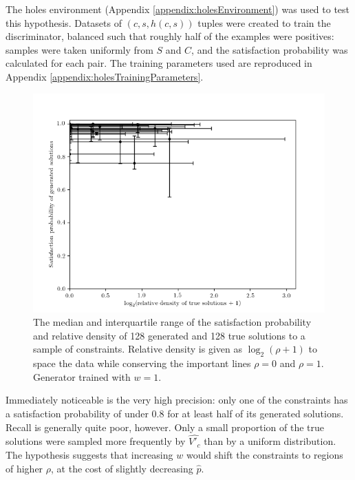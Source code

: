 \documentclass[../../main.tex]{subfiles}
\begin{document}
The holes environment (Appendix \ref{appendix:holesEnvironment}) was used to test this hypothesis.
Datasets of $(c,s,h(c,s))$ tuples were created to train the discriminator, balanced such that roughly half of the examples were positives: samples were taken uniformly from $S$ and $C$, and the satisfaction probability was calculated for each pair.
The training parameters used are reproduced in Appendix \ref{appendix:holesTrainingParameters}.
\begin{figure}[H]
    \begin{center}
    \includegraphics[width=\textwidth]{solutionPropertiesEvenlyWeighted}
    \caption{
        The median and interquartile range of the satisfaction probability and relative density of 128 generated and 128 true solutions to a sample of constraints.
        Relative density is given as $\log_2(\rho+1)$ to space the data while conserving the important lines $\rho=0$ and $\rho=1$.
        Generator trained with $w=1$.
    }
    \label{fig:solutionPropertiesEvenlyWeighted}
    \end{center}
\end{figure}
Immediately noticeable is the very high precision: only one of the constraints has a satisfaction probability of under $0.8$ for at least half of its generated solutions.
Recall is generally quite poor, however.
Only a small proportion of the true solutions were sampled more frequently by $\hat{V'_c}$ than by a uniform distribution.
The hypothesis suggests that increasing $w$ would shift the constraints to regions of higher $\rho$, at the cost of slightly decreasing $\hat{p}$.
\end{document}
